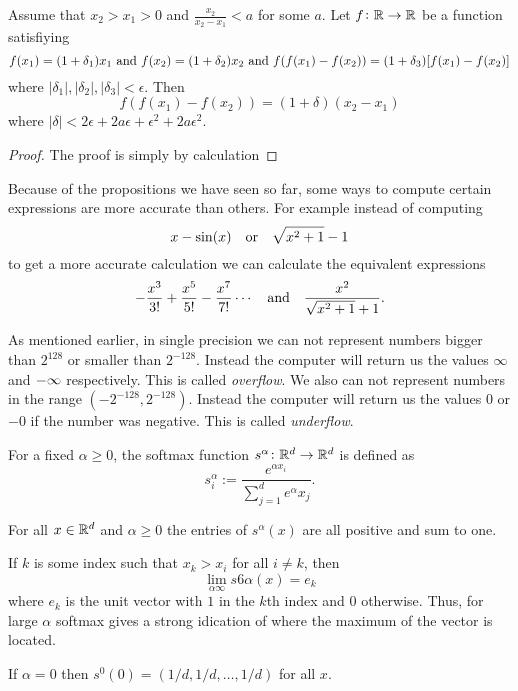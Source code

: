\documentclass[11pt,a4paper]{article}
\begin{document}
\begin{proposition}
  Assume that $x_2 > x_1 > 0$ and $\frac{x_2}{x_2 - x_1} < a$ for some $a$.
  Let $f \colon \mathbb{R} \to \mathbb{R}$ be a function satisfiying
  \[
    f(x_1) = (1 + \delta_1) x_1 \text{ and }
    f(x_2) = (1 + \delta_2) x_2 \text{ and }
    f(f(x_1) - f(x_2)) = (1 + \delta_3)[f(x_1) - f(x_2)]
  \]
  where $|\delta_1|, |\delta_2|, |\delta_3| < \epsilon$.
  Then
  \[
    f(f(x_1) - f(x_2)) = (1 + \delta)(x_2 - x_1)
  \]
  where $|\delta| < 2 \epsilon + 2 a \epsilon + \epsilon^2 + 2 a \epsilon^2$.
\end{proposition}
\begin{proof}
  The proof is simply by calculation
\end{proof}

Because of the propositions we have seen so far, some ways to compute
certain expressions are more accurate than others.
For example instead of computing
\[
  x - \sin(x) \quad \text{or} \quad
  \sqrt{x^2 + 1} - 1
\]
to get a more accurate calculation we can calculate the equivalent
expressions
\[
  - \frac{x^3}{3!} + \frac{x^5}{5!} - \frac{x^7}{7!} \cdots
  \quad \text{and} \quad
  \frac{x^2}{\sqrt{x^2 + 1} + 1}.
\]

As mentioned earlier, in single precision we can not represent numbers bigger
than $2^{128}$ or smaller than $2^{-128}$.
Instead the computer will return us the values $\infty$ and $-\infty$ 
respectively. This is called \emph{overflow}.
We also can not represent numbers in the range $(-2^{-128}, 2^{-128})$.
Instead the computer will return us the values $0$ or $-0$ if the number
was negative. This is called \emph{underflow}.

\begin{definition}
  For a fixed $\alpha \geq 0$, the softmax function 
  $s^{\alpha} \colon \mathbb{R}^d \to \mathbb{R}^d$ is defined as
  \[
    s^{\alpha}_i := \frac{e^{\alpha x_i}}{\sum_{j=1}^{d} e^{\alpha} x_j}.
  \]
\end{definition}
\begin{remark}
  For all $x \in \mathbb{R}^d$ and $\alpha \geq 0$ the entries of $s^{\alpha}(x)$
  are all positive and sum to one.
\end{remark}
\begin{remark}
  If $k$ is some index such that $x_k > x_i$ for all $i \neq k$, then
  \[
    \lim_{\alpha \infty} s6{\alpha}(x) = e_k
  \]
  where $e_k$ is the unit vector with $1$ in the $k$th index and $0$ otherwise.
  Thus, for large $\alpha$ softmax gives a strong idication of where the
  maximum of the vector is located.
\end{remark}
\begin{remark}
  If $\alpha = 0$ then $s^0(0) = (1/d, 1/d, \dots, 1/d)$ for all $x$.
\end{remark}
\end{document}
